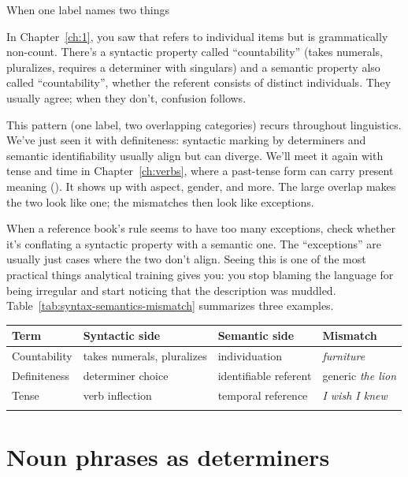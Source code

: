 \begin{tblsframed}{When one label names two things}\label{box:one-label-two-things}

In Chapter~\ref{ch:1}, you saw that  refers to individual items but is grammatically non-count. There's a syntactic property called \enquote{countability} (takes numerals, pluralizes, requires a determiner with singulars) and a semantic property also called \enquote{countability}, whether the referent consists of distinct individuals. They usually agree; when they don't, confusion follows.

This pattern (one label, two overlapping categories) recurs throughout linguistics. We've just seen it with definiteness: syntactic marking by determiners and semantic identifiability usually align but can diverge. We'll meet it again with tense and time in Chapter~\ref{ch:verbs}, where a past-tense form can carry present meaning (). It shows up with aspect, gender, and more. The large overlap makes the two look like one; the mismatches then look like exceptions.

When a reference book's rule seems to have too many exceptions, check whether it's conflating a syntactic property with a semantic one. The \enquote{exceptions} are usually just cases where the two don't align. Seeing this is one of the most practical things analytical training gives you: you stop blaming the language for being irregular and start noticing that the description was muddled. Table~\ref{tab:syntax-semantics-mismatch} summarizes three examples.

\begin{center}
\label{tab:syntax-semantics-mismatch}
\begin{tabular}{llll}
\lsptoprule
Term & Syntactic side & Semantic side & Mismatch \\
\midrule
Countability & takes numerals, pluralizes & individuation & \textit{furniture} \\
Definiteness & determiner choice & identifiable referent & generic \textit{the lion} \\
Tense & verb inflection & temporal reference & \textit{I wish I knew} \\
\lspbottomrule
\end{tabular}
\end{center}

\end{tblsframed}

\section{Noun phrases as determiners}
\label{sec:NP-as-det}

